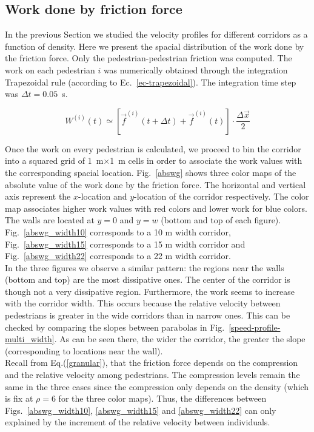 \subsection{Work done by friction force}

In the previous Section we studied the velocity profiles for different corridors as a function of density. Here we present the spacial distribution of the work done by the friction force. Only the pedestrian-pedestrian friction was computed.
The work on each pedestrian $i$ was numerically obtained through the integration Trapezoidal rule (according to Ec.~\ref{ec-trapezoidal}). The integration time step was $\Delta t = 0.05$~s. 

\begin{equation}
W^{(i)}(t) \simeq \left [ \vec{f}^{(i)}(t+\Delta t) + \vec{f}^{(i)}(t)  \right ]\cdot \frac{\Delta \vec{x}}{2} \label{ec-trapezoidal}
\end{equation}

Once the work on every pedestrian is calculated, we proceed to bin the corridor into a squared grid of 1~m$\times$1~m cells in order to associate the work values with the corresponding spacial location. Fig.~\ref{abswg} shows three color maps of the absolute value of the work done by the friction force. The horizontal and vertical axis represent the $x$-location and $y$-location of the corridor respectively. The color map associates higher work values with red colors and lower work for blue colors. The walls are located at $y=0$ and $y=w$ (bottom and top of each figure). Fig.~\ref{abswg_width10} corresponds to a 10 m width corridor, Fig.~\ref{abswg_width15} corresponds to a 15 m width corridor and Fig.~\ref{abswg_width22} corresponds to a 22 m width corridor.\\

In the three figures we observe a similar pattern: the regions near the walls (bottom and top) are the most dissipative ones. The center of the corridor is though not a very dissipative region. Furthermore, the work seems to increase with the corridor width. This occurs because the relative velocity between pedestrians is greater in the wide corridors than in narrow ones. This can be checked by comparing the slopes between parabolas in Fig.~\ref{speed-profile-multi_width}. As can be seen there, the wider the corridor, the greater the slope (corresponding to locations near the wall).\\

Recall from Eq.(\ref{granular}), that the friction force depends on the compression and the relative velocity among pedestrians. The compression levels remain the same in the three cases since the compression only depends on the density (which is fix at $\rho=6$ for the three color maps). Thus, the differences between Figs.~\ref{abswg_width10}, \ref{abswg_width15} and \ref{abswg_width22} can only explained by the increment of the relative velocity between individuals. \\

